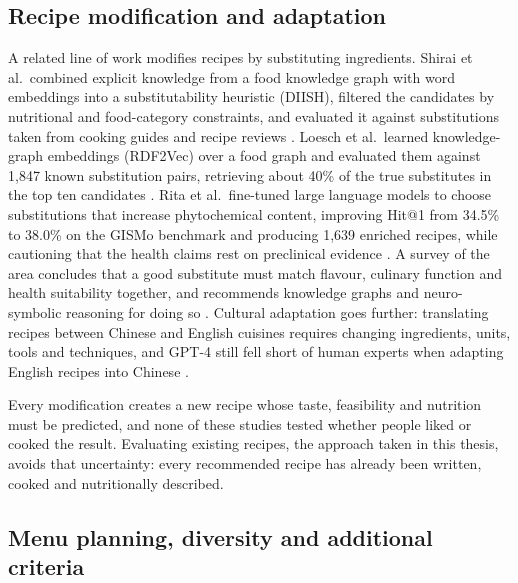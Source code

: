 \subsection{Recipe modification and adaptation}

A related line of work modifies recipes by substituting ingredients. Shirai et al.\ combined explicit knowledge from a food knowledge graph with word embeddings into a substitutability heuristic (DIISH), filtered the candidates by nutritional and food-category constraints, and evaluated it against substitutions taken from cooking guides and recipe reviews \cite{shirai2021substitutions}. Loesch et al.\ learned knowledge-graph embeddings (RDF2Vec) over a food graph and evaluated them against 1,847 known substitution pairs, retrieving about 40\% of the true substitutes in the top ten candidates \cite{loesch2022substitution}. Rita et al.\ fine-tuned large language models to choose substitutions that increase phytochemical content, improving Hit@1 from 34.5\% to 38.0\% on the GISMo benchmark and producing 1,639 enriched recipes, while cautioning that the health claims rest on preclinical evidence \cite{rita2024phytochemical}. A survey of the area concludes that a good substitute must match flavour, culinary function and health suitability together, and recommends knowledge graphs and neuro-symbolic reasoning for doing so \cite{kim2025substitution}. Cultural adaptation goes further: translating recipes between Chinese and English cuisines requires changing ingredients, units, tools and techniques, and GPT-4 still fell short of human experts when adapting English recipes into Chinese \cite{cao2024cultural}.

Every modification creates a new recipe whose taste, feasibility and nutrition must be predicted, and none of these studies tested whether people liked or cooked the result. Evaluating existing recipes, the approach taken in this thesis, avoids that uncertainty: every recommended recipe has already been written, cooked and nutritionally described.

\subsection{Menu planning, diversity and additional criteria}

